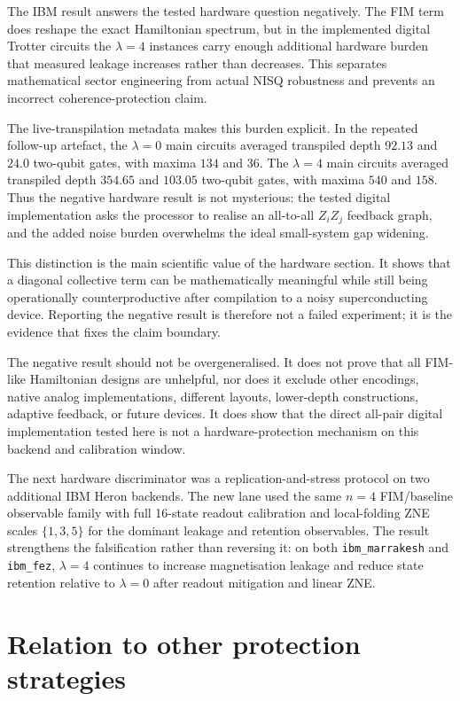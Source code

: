 \documentclass[preprint,aps,physrev,superscriptaddress,floatfix,longbibliography]{revtex4-2}
\begin{document}
The IBM result answers the tested hardware question negatively. The FIM term
does reshape the exact Hamiltonian spectrum, but in the implemented digital
Trotter circuits the $\lambda=4$ instances carry enough additional hardware
burden that measured leakage increases rather than decreases. This separates
mathematical sector engineering from actual NISQ robustness and prevents an
incorrect coherence-protection claim.

The live-transpilation metadata makes this burden explicit. In the repeated
follow-up artefact, the $\lambda=0$ main circuits averaged transpiled depth
$92.13$ and $24.0$ two-qubit gates, with maxima $134$ and $36$. The
$\lambda=4$ main circuits averaged transpiled depth $354.65$ and
$103.05$ two-qubit gates, with maxima $540$ and $158$. Thus the negative
hardware result is not mysterious: the tested digital implementation asks the
processor to realise an all-to-all $Z_iZ_j$ feedback graph, and the added
noise burden overwhelms the ideal small-system gap widening.

This distinction is the main scientific value of the hardware section. It shows
that a diagonal collective term can be mathematically meaningful while still
being operationally counterproductive after compilation to a noisy
superconducting device. Reporting the negative result is therefore not a failed
experiment; it is the evidence that fixes the claim boundary.

The negative result should not be overgeneralised. It does not prove that all
FIM-like Hamiltonian designs are unhelpful, nor does it exclude other encodings,
native analog implementations, different layouts, lower-depth constructions,
adaptive feedback, or future devices. It does show that the direct all-pair
digital implementation tested here is not a hardware-protection mechanism on
this backend and calibration window.

The next hardware discriminator was a replication-and-stress protocol on two
additional IBM Heron backends. The new lane used the same $n=4$
FIM/baseline observable family with full 16-state readout calibration and
local-folding ZNE scales $\{1,3,5\}$ for the dominant leakage and retention
observables. The result strengthens the falsification rather than reversing
it: on both \texttt{ibm\_marrakesh} and \texttt{ibm\_fez}, $\lambda=4$
continues to increase magnetisation leakage and reduce state retention
relative to $\lambda=0$ after readout mitigation and linear ZNE.

\section{Relation to other protection strategies}
\end{document}
